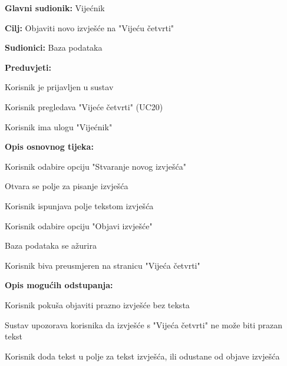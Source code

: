 					\noindent {}
					\begin{packed_item}
	
						\item \textbf{Glavni sudionik: }Vijećnik
						\item  \textbf{Cilj:} Objaviti novo izvješće na "Vijeću četvrti"
						\item  \textbf{Sudionici:} Baza podataka
						\item  \textbf{Preduvjeti:}
						\item[] \begin{packed_enum}
							\item Korisnik je prijavljen u sustav
							\item Korisnik pregledava "Vijeće četvrti" (UC20)
							\item Korisnik ima ulogu "Vijećnik"
						\end{packed_enum}
						\item  \textbf{Opis osnovnog tijeka:}
						
						\item[] \begin{packed_enum}
	
							\item Korisnik odabire opciju "Stvaranje novog izvješća" 
							\item Otvara se polje za pisanje izvješća
							\item Korisnik ispunjava polje tekstom izvješća
							\item Korisnik odabire opciju "Objavi izvješće"
							\item Baza podataka se ažurira
							\item Korisnik biva preusmjeren na stranicu "Vijeća četvrti"
							
							
						\end{packed_enum}
						
						\item  \textbf{Opis mogućih odstupanja:}
						
						\item[] \begin{packed_item}
	
							\item[4.a] Korisnik pokuša objaviti prazno izvješće bez teksta
							\item[] \begin{packed_enum}
								
								\item Sustav upozorava korisnika da izvješće s "Vijeća četvrti" ne može biti prazan tekst
								\item Korisnik doda tekst u polje za tekst izvješća, ili odustane od objave izvješća
							\end{packed_enum}
								

\end{packed_item}
\end{packed_item}
